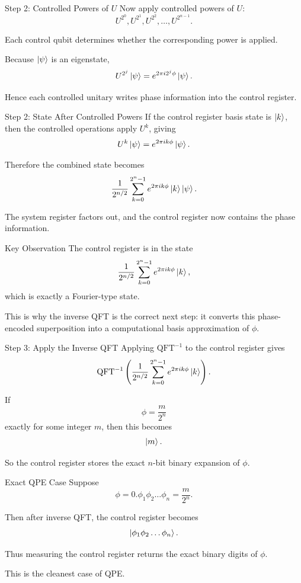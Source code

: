 \documentclass{beamer}
\begin{document}
\begin{frame}{Step 2: Controlled Powers of \(U\)}
Now apply controlled powers of \(U\):
\[
U^{2^0}, U^{2^1}, U^{2^2}, \dots, U^{2^{n-1}}.
\]

Each control qubit determines whether the corresponding power is applied.

Because \(\ket{\psi}\) is an eigenstate,
\[
U^{2^j}\ket{\psi} = e^{2\pi i 2^j \phi}\ket{\psi}.
\]

Hence each controlled unitary writes phase information into the control register.
\end{frame}

\begin{frame}{Step 2: State After Controlled Powers}
If the control register basis state is \(\ket{k}\), then the controlled operations apply \(U^k\), giving
\[
U^k\ket{\psi} = e^{2\pi i k\phi}\ket{\psi}.
\]

Therefore the combined state becomes
\[
\frac{1}{2^{n/2}}
\sum_{k=0}^{2^n-1}
e^{2\pi i k\phi}\ket{k}\ket{\psi}.
\]

The system register factors out, and the control register now contains the phase information.
\end{frame}

\begin{frame}{Key Observation}
The control register is in the state
\[
\frac{1}{2^{n/2}}
\sum_{k=0}^{2^n-1} e^{2\pi i k\phi}\ket{k},
\]
which is exactly a Fourier-type state.

This is why the inverse QFT is the correct next step:
it converts this phase-encoded superposition into a computational basis approximation of \(\phi\).
\end{frame}

\begin{frame}{Step 3: Apply the Inverse QFT}
Applying \(\mathrm{QFT}^{-1}\) to the control register gives
\[
\mathrm{QFT}^{-1}
\left(
\frac{1}{2^{n/2}}
\sum_{k=0}^{2^n-1} e^{2\pi i k\phi}\ket{k}
\right).
\]

If
\[
\phi = \frac{m}{2^n}
\]
exactly for some integer \(m\), then this becomes
\[
\ket{m}.
\]

So the control register stores the exact \(n\)-bit binary expansion of \(\phi\).
\end{frame}

\begin{frame}{Exact QPE Case}
Suppose
\[
\phi = 0.\phi_1\phi_2\dots\phi_n
=
\frac{m}{2^n}.
\]

Then after inverse QFT, the control register becomes
\[
\ket{\phi_1\phi_2\dots\phi_n}.
\]

Thus measuring the control register returns the exact binary digits of \(\phi\).

This is the cleanest case of QPE.
\end{frame}
\end{document}
